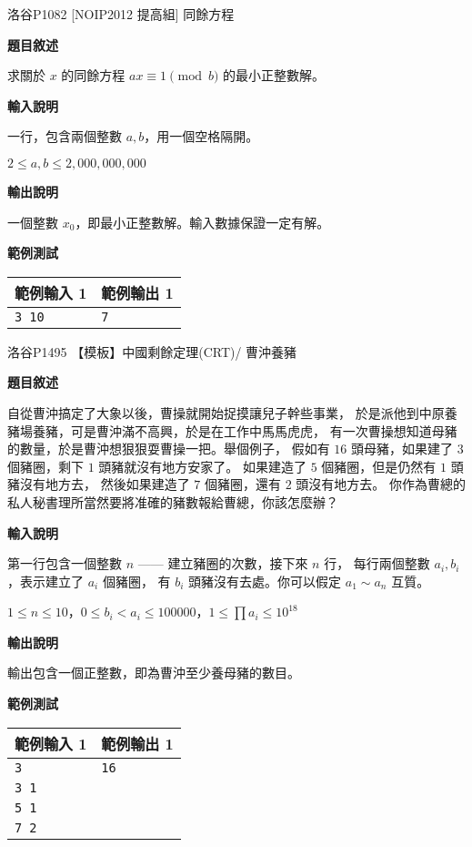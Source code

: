     \problem 洛谷P1082 [NOIP2012 提高組] 同餘方程

    \textbf{題目敘述}

    求關於 $x$ 的同餘方程 $a x \equiv 1 \pmod {b}$ 的最小正整數解。

    \textbf{輸入說明}

    一行，包含兩個整數 $a,b$，用一個空格隔開。

    $2 \leq a, b \leq 2,000,000,000$

    \textbf{輸出說明}

    一個整數 $x_0$，即最小正整數解。輸入數據保證一定有解。

    \textbf{範例測試}

    \begin{tabular}{|m{7cm}|m{7cm}|}
        \hline
        範例輸入 1 & 範例輸出 1 \\
        \hline
        \verb|3 10| & \verb|7| \\
        \hline
    \end{tabular}

    \problem 洛谷P1495 【模板】中國剩餘定理(CRT)/ 曹沖養豬

    \textbf{題目敘述}

    自從曹沖搞定了大象以後，曹操就開始捉摸讓兒子幹些事業，
    於是派他到中原養豬場養豬，可是曹沖滿不高興，於是在工作中馬馬虎虎，
    有一次曹操想知道母豬的數量，於是曹沖想狠狠耍曹操一把。舉個例子，
    假如有 $16$ 頭母豬，如果建了 $3$ 個豬圈，剩下 $1$ 頭豬就沒有地方安家了。
    如果建造了 $5$ 個豬圈，但是仍然有 $1$ 頭豬沒有地方去，
    然後如果建造了 $7$ 個豬圈，還有 $2$ 頭沒有地方去。
    你作為曹總的私人秘書理所當然要將准確的豬數報給曹總，你該怎麼辦？

    \textbf{輸入說明}

    第一行包含一個整數 $n$ —— 建立豬圈的次數，接下來 $n$ 行，
    每行兩個整數 $a_i, b_i$，表示建立了 $a_i$ 個豬圈，
    有 $b_i$ 頭豬沒有去處。你可以假定 $a_1 \sim a_n$ 互質。

    $1 \leq n \le 10$，$0 \leq b_i < a_i \le 100000$，$1 \leq \prod a_i \leq 10^{18}$

    \textbf{輸出說明}

    輸出包含一個正整數，即為曹沖至少養母豬的數目。

    \textbf{範例測試}

    \begin{tabular}{|m{7cm}|m{7cm}|}
        \hline
        範例輸入 1 & 範例輸出 1 \\
        \hline
        \verb|3| & \verb|16| \\
        \verb|3 1| & \\
        \verb|5 1| & \\
        \verb|7 2| & \\
        \hline
    \end{tabular}

